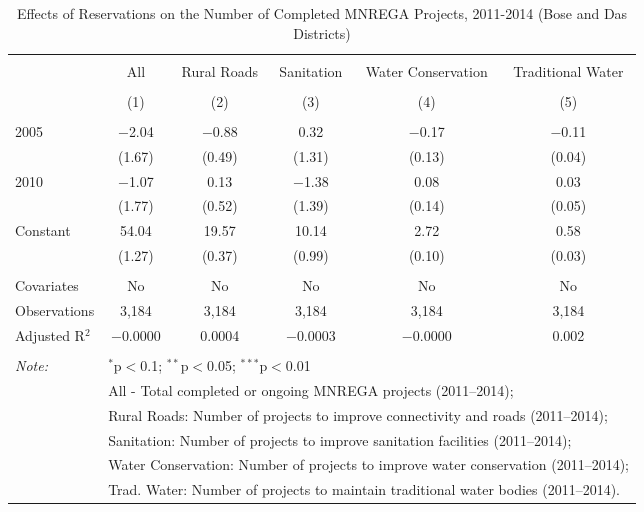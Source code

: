 
\begin{table}[!htbp] \centering 
  \caption{Effects of Reservations on the Number of Completed MNREGA Projects, 2011-2014 (Bose and Das Districts)} 
  \label{} 
\begin{tabular}{@{\extracolsep{5pt}}lccccc} 
\\[-1.8ex]\hline 
\hline \\[-1.8ex] 
 & All & Rural Roads & Sanitation & Water Conservation & Traditional Water \\ 
\\[-1.8ex] & (1) & (2) & (3) & (4) & (5)\\ 
\hline \\[-1.8ex] 
 2005 & $-$2.04 & $-$0.88 & 0.32 & $-$0.17 & $-$0.11 \\ 
  & (1.67) & (0.49) & (1.31) & (0.13) & (0.04) \\ 
  2010 & $-$1.07 & 0.13 & $-$1.38 & 0.08 & 0.03 \\ 
  & (1.77) & (0.52) & (1.39) & (0.14) & (0.05) \\ 
  Constant & 54.04 & 19.57 & 10.14 & 2.72 & 0.58 \\ 
  & (1.27) & (0.37) & (0.99) & (0.10) & (0.03) \\ 
 \hline \\[-1.8ex] 
Covariates & No & No & No & No & No \\ 
Observations & 3,184 & 3,184 & 3,184 & 3,184 & 3,184 \\ 
Adjusted R$^{2}$ & $-$0.0000 & 0.0004 & $-$0.0003 & $-$0.0000 & 0.002 \\ 
\hline 
\hline \\[-1.8ex] 
\textit{Note:}  & \multicolumn{5}{l}{$^{*}$p$<$0.1; $^{**}$p$<$0.05; $^{***}$p$<$0.01} \\ 
 & \multicolumn{5}{l}{All - Total completed or ongoing MNREGA projects (2011--2014);} \\ 
 & \multicolumn{5}{l}{Rural Roads: Number of projects to improve connectivity and roads (2011--2014);} \\ 
 & \multicolumn{5}{l}{Sanitation:  Number of projects to improve sanitation facilities  (2011--2014);} \\ 
 & \multicolumn{5}{l}{Water Conservation: Number of projects to improve water conservation (2011--2014);} \\ 
 & \multicolumn{5}{l}{Trad. Water: Number of projects to maintain traditional water bodies (2011--2014).} \\ 
\end{tabular} 
\end{table} 
